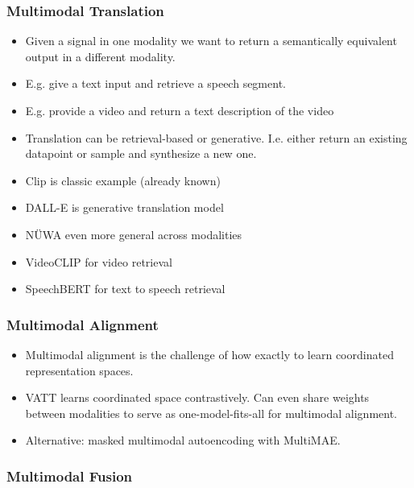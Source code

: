 \documentclass[
]{krantz}
\providecommand{\tightlist}{%
  \setlength{\itemsep}{0pt}\setlength{\parskip}{0pt}}
\begin{document}
\hypertarget{multimodal-translation}{%
\subsubsection{Multimodal Translation}\label{multimodal-translation}}

\begin{itemize}
\tightlist
\item
  Given a signal in one modality we want to return a semantically equivalent output in a different modality.
\item
  E.g. give a text input and retrieve a speech segment.
\item
  E.g. provide a video and return a text description of the video
\item
  Translation can be retrieval-based or generative. I.e. either return an existing datapoint or sample and synthesize a new one.
\item
  Clip is classic example (already known)
\item
  DALL-E is generative translation model
\item
  NÜWA even more general across modalities
\item
  VideoCLIP for video retrieval
\item
  SpeechBERT for text to speech retrieval
\end{itemize}

\hypertarget{multimodal-alignment}{%
\subsubsection{Multimodal Alignment}\label{multimodal-alignment}}

\begin{itemize}
\tightlist
\item
  Multimodal alignment is the challenge of how exactly to learn coordinated representation spaces.
\item
  VATT learns coordinated space contrastively. Can even share weights between modalities to serve as one-model-fits-all for multimodal alignment.
\item
  Alternative: masked multimodal autoencoding with MultiMAE.
\end{itemize}

\hypertarget{multimodal-fusion}{%
\subsubsection{Multimodal Fusion}\label{multimodal-fusion}}
\end{document}
